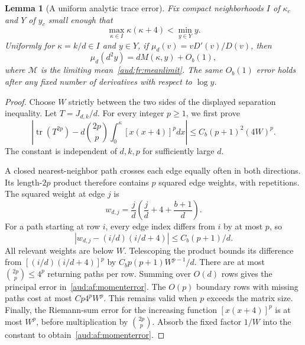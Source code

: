 \documentclass[11pt,a4paper]{article}
\numberwithin{equation}{section}
\newtheorem{lemma}[theorem]{Lemma}
\begin{document}
\begin{lemma}[A uniform analytic trace error]\label{aud:af:trace}
Fix compact neighborhoods $I$ of $\kappa_c$ and $Y$ of $y_c$ small enough that
\[
 \max_{\kappa\in I}\kappa(\kappa+4)<\min_{y\in Y}y.
\]
Uniformly for $\kappa=k/d\in I$ and $y\in Y$, if $\mu_d(v)=vD'(v)/D(v)$, then
\begin{equation}\label{aud:af:meanerror}
 \mu_d(d^2y)=dM(\kappa,y)+O_b(1),
\end{equation}
where $\mathcal M$ is the limiting mean~\eqref{aud:fr:meanlimit}.
The same $O_b(1)$ error holds after any fixed number of derivatives with respect to $\log y$.
\end{lemma}
\begin{proof}
Choose $W$ strictly between the two sides of the displayed separation inequality. Let $T=J_{d,k}/d$. For every integer $p\ge1$, we first prove
\begin{equation}\label{aud:af:momenterror}
 \left|\operatorname{tr}(T^{2p})
 -d\binom{2p}{p}\int_0^\kappa[x(x+4)]^pdx\right|
 \le C_b(p+1)^2(4W)^p.
\end{equation}
The constant is independent of $d,k,p$ for sufficiently large $d$.

A closed nearest-neighbor path crosses each edge equally often in both directions. Its length-$2p$ product therefore contains $p$ squared edge weights, with repetitions. The squared weight at edge $j$ is
\[
 w_{d,j}=\frac jd\left(\frac jd+4+\frac{b+1}{d}\right).
\]
For a path starting at row $i$, every edge index differs from $i$ by at most $p$, so
\[
 |w_{d,j}-(i/d)(i/d+4)|\le C_b(p+1)/d.
\]
All relevant weights are below $W$. Telescoping the product bounds its difference from $[(i/d)(i/d+4)]^p$ by $C_bp(p+1)W^{p-1}/d$. There are at most $\binom{2p}{p}\le4^p$ returning paths per row. Summing over $O(d)$ rows gives the principal error in~\eqref{aud:af:momenterror}. The $O(p)$ boundary rows with missing paths cost at most $Cp4^pW^p$. This remains valid when $p$ exceeds the matrix size. Finally, the Riemann-sum error for the increasing function $[x(x+4)]^p$ is at most $W^p$, before multiplication by $\binom{2p}{p}$. Absorb the fixed factor $1/W$ into the constant to obtain~\eqref{aud:af:momenterror}.


\end{proof}
\end{document}
